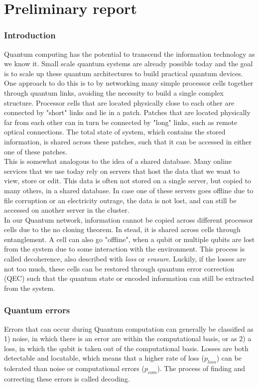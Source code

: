 \chapter{Preliminary report}

\subsection*{Introduction}

Quantum computing has the potential to transcend the information technology as we know it. Small scale quantum systems are already possible today and the goal is to scale up these quantum architectures to build practical quantum devices. One approach to do this is to by networking many simple processor cells together through quantum links, avoiding the necessity to build a single complex structure. Processor cells that are located physically close to each other are connected by "short" links and lie in a patch. Patches that are located physically far from each other can in turn be connected by "long" links, such as remote optical connections. The total state of system, which contains the stored information, is shared across these patches, such that it can be accessed in either one of these patches. \\

This is somewhat analogous to the idea of a shared database. Many online services that we use today rely on servers that host the data that we want to view, store or edit. This data is often not stored on a single server, but copied to many others, in a shared database. In case one of these servers goes offline due to file corruption or an electricity outrage, the data is not lost, and can still be accessed on another server in the cluster.\\

In our Quantum network, information cannot be copied across different processor cells due to the no cloning theorem. In stead, it is shared across cells through entanglement. A cell can also go "offline", when a qubit or multiple qubits are lost from the system due to some interaction with the environment. This process is called decoherence, also described with \emph{loss} or \emph{erasure}. Luckily, if the losses are not too much, these cells can be restored through quantum error correction (QEC) such that the quantum state or encoded information can still be extracted from the system. \\

\subsection*{Quantum errors}
Errors that can occur during Quantum computation can generally be classified as 1) noise, in which there is an error are within the computational basis, or as 2) a loss, in which the qubit is
taken out of the computational basis. Losses are both detectable and locatable, which means that a higher rate of loss ($p_{loss}$) can be tolerated than noise or computational errors ($p_{com}$). The process of finding and correcting these errors is called decoding. \\

